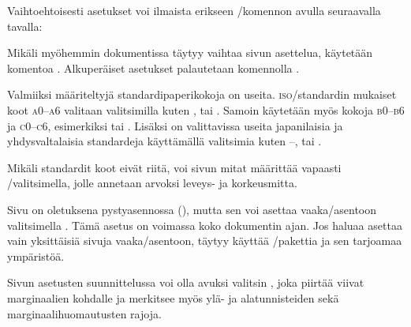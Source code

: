 Vaihtoehtoisesti asetukset voi ilmaista erikseen \-/komennon avulla seuraavalla tavalla:

\begin{koodilohkosis}
  \usepackage{geometry}
  \geometry{a4paper, top=20mm, bottom=30mm, left=20mm, right=20mm}
\end{koodilohkosis}

Mikäli myöhemmin dokumentissa täytyy vaihtaa sivun asettelua, käytetään
komentoa . Alkuperäiset asetukset
palautetaan komennolla .

\begin{koodilohkosis}
  \restoregeometry     %
\end{koodilohkosis}

Valmiiksi määriteltyjä standardipaperikokoja on useita.
\textsc{iso}\-/standardin mukaiset koot \textsc{a0}--\textsc{a6}
valitaan valitsimilla kuten  ,
 tai . Samoin käytetään myös kokoja
\textsc{b0}--\textsc{b6} ja \textsc{c0}--\textsc{c6}, esimerkiksi
 tai . Lisäksi on valittavissa useita
japanilaisia ja yhdysvaltalaisia standardeja käyttämällä valitsimia
kuten --,  tai
.

Mikäli standardit koot eivät riitä, voi sivun mitat määrittää vapaasti
\-/valitsimella,  jolle
annetaan arvoksi leveys- ja korkeusmitta.

\begin{koodilohkosis}
\end{koodilohkosis}

Sivu on oletuksena pysty\-asen\-nossa (),
 mutta sen voi asettaa vaaka\-/asentoon
valitsimella .  Tämä asetus
on voimassa koko dokumentin ajan. Jos haluaa asettaa vain yksittäisiä
sivuja vaaka\-/asentoon, täytyy käyttää
\-/pakettia ja sen tarjoamaa
ympäristöä.

Sivun asetusten suunnittelussa voi olla avuksi valitsin
,  joka piirtää viivat
marginaalien kohdalle ja merkitsee myös ylä- ja alatunnisteiden sekä
marginaalihuomautusten rajoja.

